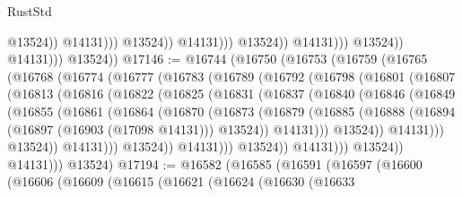 \begin{lexlean}{RustStd}
\begin{coremodule}
                                                @13524))
                                            @14131)))
                                      @13524))
                                  @14131)))
                            @13524))
                        @14131)))
                  @13524))
              @14131)))
        @13524))
@17146 := @16744
    (@16750
      (@16753
        (@16759
          (@16765
            (@16768
              (@16774
                (@16777
                  (@16783
                    (@16789
                      (@16792
                        (@16798
                          (@16801
                            (@16807
                              (@16813
                                (@16816
                                  (@16822
                                    (@16825
                                      (@16831
                                        (@16837
                                          (@16840
                                            (@16846
                                              (@16849
                                                (@16855
                                                  (@16861
                                                    (@16864
                                                      (@16870
                                                        (@16873
                                                          (@16879
                                                            (@16885
                                                              (@16888
                                                                (@16894
                                                                  (@16897 (@16903 (@17098 @14131)))
                                                                  @13524))
                                                              @14131)))
                                                        @13524))
                                                    @14131)))
                                              @13524))
                                          @14131)))
                                    @13524))
                                @14131)))
                          @13524))
                      @14131)))
                @13524))
            @14131)))
      @13524)
@17194 := @16582
    (@16585
      (@16591
        (@16597
          (@16600
            (@16606
              (@16609
                (@16615
                  (@16621
                    (@16624
                      (@16630
                        (@16633

\end{coremodule}
\end{lexlean}
